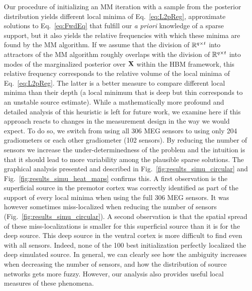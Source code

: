 Our procedure of initializing an MM iteration with a sample from the posterior distribution yields different local minima of Eq.~\ref{eq:L2pReg}, \ie approximate solutions to Eq.~\ref{eq:FwdEq} that fulfill our \emph{a priori} knowledge of a sparse support, but it also yields the relative frequencies with which these minima are found by the MM algorithm. If we assume that the division of $\mathbb{R}^{q\times t}$ into attractors of the MM algorithm roughly overlaps with the division of $\mathbb{R}^{q\times t}$ into modes of the marginalized posterior over $\mathbf{X}$ within the HBM framework, this relative frequency corresponds to the relative volume of the local minima of Eq.~\ref{eq:L2pReg}. The latter is a better measure to compare different local minima than their depth (a local minimum that is deep but thin corresponds to an unstable source estimate). While a mathematically more profound and detailed analysis of this heuristic is left for future work, we examine here if this approach reacts to changes in the measurement design in the way we would expect. To do so, we switch from using all 306 MEG sensors to using only 204 gradiometers or each other gradiometer (102 sensors). By reducing the number of sensors we increase the under-determinedness of the problem and the intuition is that it should lead to
more variability among the plausible sparse solutions. The graphical analysis presented and described in Fig.~\ref{fig:results_simu_circular} and Fig.~\ref{fig:results_simu_heat_maps} confirms this. A first observation is the superficial source in the premotor cortex was correctly identified as part of the support of every local minima when using the full 306 MEG sensors. It was however sometimes miss-localized when reducing the number of sensors (Fig.~\ref{fig:results_simu_circular}). A second observation is that the spatial spread of these miss-localizations is smaller for this superficial source than it is for the deep source. This deep source in the ventral cortex is more difficult to find even with all sensors. Indeed, none of the 100 best initialization perfectly localized the deep simulated source. In general, we can clearly see how the ambiguity increases when decreasing the number of sensors, and how the distribution of source networks gets more fuzzy. However, our analysis also provides useful local measures of these phenomena.


